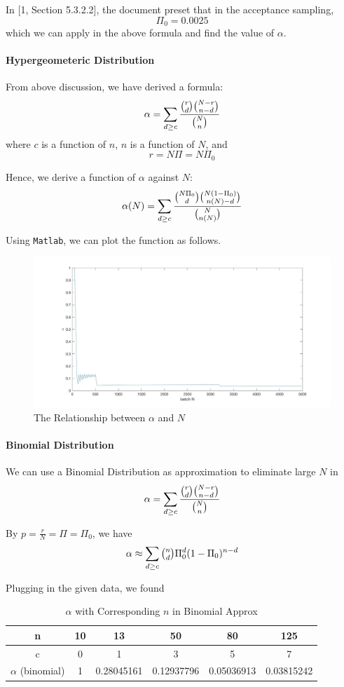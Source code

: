 \documentclass[a4paper]{article}
\begin{document}
In [1, Section 5.3.2.2], the document preset that in the acceptance sampling,
$$\Pi_0 = 0.0025$$
which we can apply in the above formula and find the value of $\alpha$.

\paragraph{Hypergeometeric Distribution}
From above discussion, we have derived a formula:
$$\alpha = \sum_{d\geq c} \displaystyle\frac{\tbinom{r}{d}\tbinom{N-r}{n-d}}{\tbinom{N}{n}}$$
where $c$ is a function of $n$, $n$ is a function of $N$, and
$$r = N\Pi = N\Pi_0$$

Hence, we derive a function of $\alpha$ against $N$:
\begin{equation}
\alpha(N) = \sum_{d\geq c} \displaystyle\frac{\tbinom{N\Pi_0}{d}\tbinom{N(1-\Pi_0)}{n(N)-d}}{\tbinom{N}{n(N)}}
\end{equation}

Using \texttt{Matlab}, we can plot the function as follows.
\begin{figure}[!htbp] 
\centering 
\includegraphics[width=1\linewidth]{alpha-N.jpg}  
\caption{The Relationship between $\alpha$ and $N$} 
\end{figure}

\paragraph{Binomial Distribution}
We can use a Binomial Distribution as approximation to eliminate large $N$ in
$$\alpha = \sum_{d\geq c} \displaystyle\frac{\tbinom{r}{d}\tbinom{N-r}{n-d}}{\tbinom{N}{n}}$$

By $p = \displaystyle\frac{r}{N}=\Pi=\Pi_0$, we have
$$\alpha \approx \sum_{d\geq c}\tbinom{n}{d}\Pi_0^d(1-\Pi_0)^{n-d}$$

Plugging in the given data, we found
\begin{table}[!htbp]
  \centering
    \begin{tabular}{|c|c|c|c|c|c|}
    \hline
    n     & 10    & 13    & 50    & 80    & 125 \\
    \hline
    c     & 0     & 1     & 3     & 5     & 7 \\
    \hline
    $\alpha$ (binomial) & 1     & 0.28045161 & 0.12937796 & 0.05036913 & 0.03815242 \\
    \hline
    \end{tabular}%
    \caption{$\alpha$ with Corresponding $n$ in Binomial Approx}
\end{table}%
\end{document}

